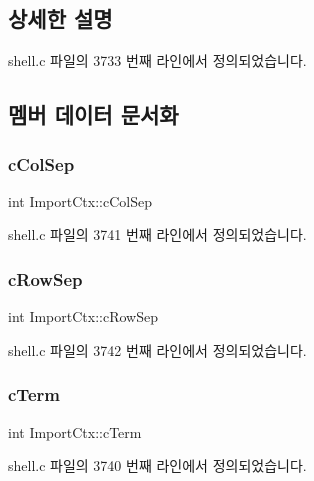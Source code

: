 \subsection{상세한 설명}


shell.\+c 파일의 3733 번째 라인에서 정의되었습니다.



\subsection{멤버 데이터 문서화}
\mbox{\label{struct_import_ctx_a5c5dc07e3bd063d2da26da4a83f46576}} 
\subsubsection{\texorpdfstring{c\+Col\+Sep}{cColSep}}
{\footnotesize\ttfamily int Import\+Ctx\+::c\+Col\+Sep}



shell.\+c 파일의 3741 번째 라인에서 정의되었습니다.

\mbox{\label{struct_import_ctx_a9b23999b41777a9726b91ec61b74f21a}} 
\subsubsection{\texorpdfstring{c\+Row\+Sep}{cRowSep}}
{\footnotesize\ttfamily int Import\+Ctx\+::c\+Row\+Sep}



shell.\+c 파일의 3742 번째 라인에서 정의되었습니다.

\mbox{\label{struct_import_ctx_a32c66d4ff064ed9d5775ec6a0bab66ba}} 
\subsubsection{\texorpdfstring{c\+Term}{cTerm}}
{\footnotesize\ttfamily int Import\+Ctx\+::c\+Term}



shell.\+c 파일의 3740 번째 라인에서 정의되었습니다.

